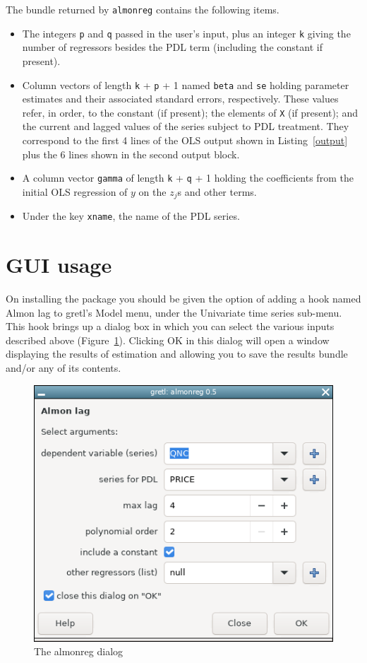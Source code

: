 \documentclass{article}
\begin{document}
The bundle returned by \texttt{almonreg} contains the following items.
\begin{itemize}
\item The integers \texttt{p} and \texttt{q} passed in the user's
  input, plus an integer \texttt{k} giving the number of regressors
  besides the PDL term (including the constant if present).
\item Column vectors of length \texttt{k} + \texttt{p} + 1 named
  \texttt{beta} and \texttt{se} holding parameter estimates and their
  associated standard errors, respectively. These values refer, in
  order, to the constant (if present); the elements of \texttt{X} (if
  present); and the current and lagged values of the series subject to
  PDL treatment. They correspond to the first 4 lines of the OLS
  output shown in Listing~\ref{output} plus the 6 lines shown in the
  second output block.
\item A column vector \texttt{gamma} of length \texttt{k} + \texttt{q}
  + 1 holding the coefficients from the initial OLS regression of $y$
  on the $z_j$s and other terms.
\item Under the key \texttt{xname}, the name of the PDL series.

\end{itemize}

\section{GUI usage}

On installing the package you should be given the option of adding a
hook named \textsf{Almon lag} to gretl's \textsf{Model} menu, under
the \textsf{Univariate time series} sub-menu. This hook brings up a
dialog box in which you can select the various inputs described above
(Figure~\ref{fig:dialog}). Clicking \textsf{OK} in this dialog will
open a window displaying the results of estimation and allowing you to
save the results bundle and/or any of its contents.

\begin{figure}[htbp]
  \centering
  \includegraphics[scale=0.6]{almonreg.png}
  \caption{The almonreg dialog}
  \label{fig:dialog}
\end{figure}



\end{document}
